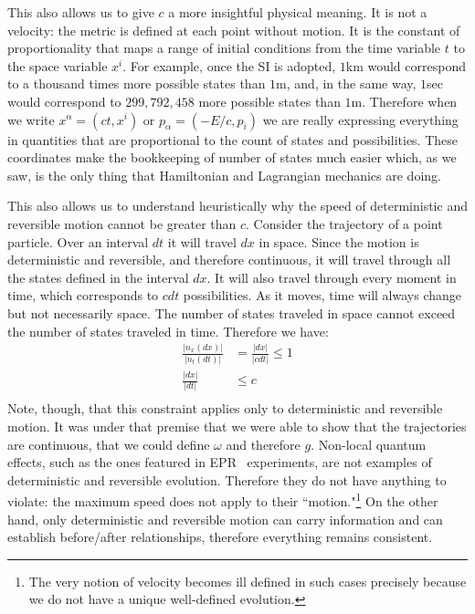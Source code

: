 \documentclass[smallextended]{svjour3}
\numberwithin{equation}{section}
\theoremstyle{definition}
\begin{document}
This also allows us to give $c$ a more insightful physical meaning. It is not a velocity: the metric is defined at each point without motion. It is the constant of proportionality that maps a range of initial conditions from the time variable $t$ to the space variable $x^i$. For example, once the SI is adopted, $1$km would correspond to a thousand times more possible states than $1$m, and, in the same way, $1$sec would correspond to $299,792,458$ more possible states than $1$m. Therefore when we write $x^\alpha = (ct, x^i)$ or $p_\alpha = (- E/c, p_i)$ we are really expressing everything in quantities that are proportional to the count of states and possibilities. These coordinates make the bookkeeping of number of states much easier which, as we saw, is the only thing that Hamiltonian and Lagrangian mechanics are doing.

This also allows us to understand heuristically why the speed of deterministic and reversible motion cannot be greater than $c$. Consider the trajectory of a point particle. Over an interval $dt$ it will travel $dx$ in space. Since the motion is deterministic and reversible, and therefore continuous, it will travel through all the states defined in the interval $dx$. It will also travel through every moment in time, which corresponds to $cdt$ possibilities. As it moves, time will always change but not necessarily space. The number of states traveled in space cannot exceed the number of states traveled in time. Therefore we have:
\begin{align*}
\frac{|n_x(dx)|}{|n_t(dt)|} &=  \frac{|dx|}{|c dt|} \leq 1 \\
\frac{|dx|}{|dt|} & \leq c \\
\end{align*}
Note, though, that this constraint applies only to deterministic and reversible motion. It was under that premise that we were able to show that the trajectories are continuous, that we could define $\omega$ and therefore $g$. Non-local quantum effects, such as the ones featured in EPR~\cite{EPR} experiments, are not examples of deterministic and reversible evolution. Therefore they do not have anything to violate: the maximum speed does not apply to their ``motion."\footnote{The very notion of velocity becomes ill defined in such cases precisely because we do not have a unique well-defined evolution.} On the other hand, only deterministic and reversible motion can carry information and can establish before/after relationships, therefore everything remains consistent.
\end{document}
